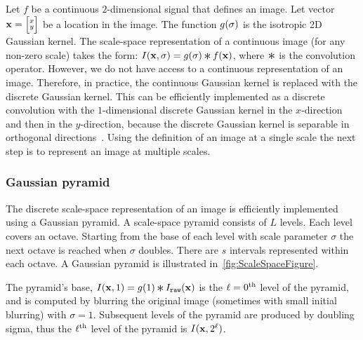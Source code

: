         Let $f$ be a continuous $2$-dimensional signal that defines an image. Let vector $\mathbf{x}= \Bigl[\negthinspace \begin{smallmatrix}  x\\ y \end{smallmatrix} \negthinspace \Bigr] $ be a
        location in the image. The function $g(\sigma)$
        is the isotropic 2D Gaussian kernel. The scale-space representation of a continuous image (for any non-zero
        scale) takes the form: $\img(\pt, \scale) = g(\scale) \conv f(\pt)$, where $\conv$ is the convolution
        operator. However, we do not have access to a continuous representation of an image. Therefore, in
        practice, the continuous Gaussian kernel is replaced with the discrete Gaussian kernel. This can be
        efficiently implemented as a discrete convolution with the $1$-dimensional discrete Gaussian kernel in the
        $x$-direction and then in the $y$-direction, because the discrete Gaussian kernel is separable in
        orthogonal directions~\cite{lindeberg_scale_space_1993}. Using the definition of an image at a single scale
        the next step is to represent an image at multiple scales.

       \subsubsection{Gaussian pyramid}

           \newcommand{\downsamp}[2]{#1[::\tightpad#2,::\tightpad#2]}
            The discrete scale-space representation of an image is efficiently implemented using a Gaussian
            pyramid. A scale-space pyramid consists of $L$ levels. Each level covers an octave. Starting from the
            base of each level with scale parameter $\sigma$ the next octave is reached when $\sigma$ doubles.
            There are $s$ intervals represented within each octave. A Gaussian pyramid is illustrated
            in~\cref{fig:ScaleSpaceFigure}.

            \ScaleSpaceFigure{}

            The pyramid's base, %
            $\img(\pt, 1) = g( 1 ) \conv \rawimg(\pt)$ %
            is the $\ell=0^{\textrm{th}}{}$ level of the pyramid, and is computed by blurring the original image (sometimes
            with small initial blurring) with $\sigma=1$. Subsequent levels of the pyramid are produced by doubling
            sigma, thus the $\ell^{\textrm{th}}{}$ level of the pyramid is $I(\mathbf{x}, 2^\ell)$.

